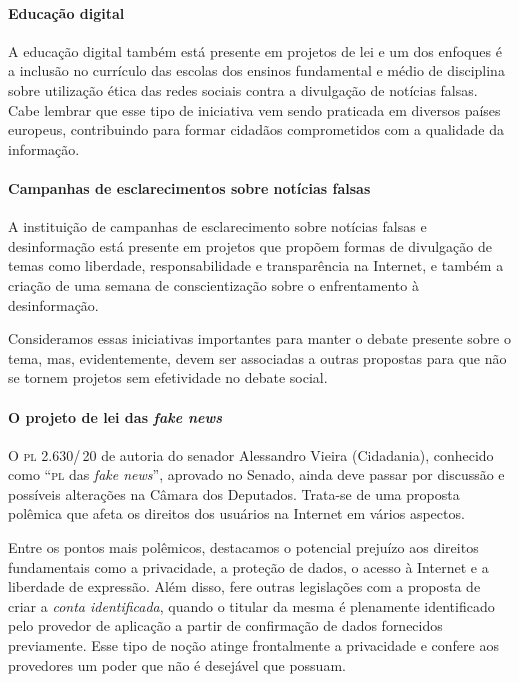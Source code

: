 \paragraph{Educação digital} A educação digital também está presente em projetos de lei e um dos enfoques é a inclusão no currículo das escolas dos ensinos fundamental e médio de disciplina sobre utilização ética das redes sociais contra a divulgação de notícias falsas. Cabe lembrar que esse tipo de iniciativa vem sendo praticada em diversos países europeus, contribuindo para formar cidadãos comprometidos com a qualidade da informação.

\paragraph{Campanhas de esclarecimentos sobre notícias falsas} A instituição de campanhas de esclarecimento sobre notícias falsas e desinformação está presente em projetos que propõem formas de divulgação de temas como liberdade, responsabilidade e transparência na Internet, e também a criação de uma semana de conscientização sobre o enfrentamento à desinformação.

Consideramos essas iniciativas importantes para manter o debate presente sobre o tema, mas, evidentemente, devem ser associadas a outras propostas para que não se tornem projetos sem efetividade no debate social.

\paragraph{O projeto de lei das \textit{fake news}} O \textsc{pl} 2.630/\,20 de autoria do senador Alessandro Vieira (Cidadania), conhecido como ``\textsc{pl} das \textit{fake news}'', aprovado no Senado, ainda deve passar por discussão e possíveis alterações na Câmara dos Deputados. Trata-se de uma proposta polêmica que afeta os direitos dos usuários na Internet em vários aspectos.

Entre os pontos mais polêmicos, destacamos o potencial prejuízo aos direitos fundamentais como a privacidade, a proteção de dados, o acesso à Internet e a liberdade de expressão. Além disso, fere outras legislações com a proposta de criar a \textit{conta identificada}, quando o titular da mesma é plenamente identificado pelo provedor de aplicação a partir de confirmação de dados fornecidos previamente. Esse tipo de noção atinge frontalmente a privacidade e confere aos provedores um poder que não é desejável que possuam.


